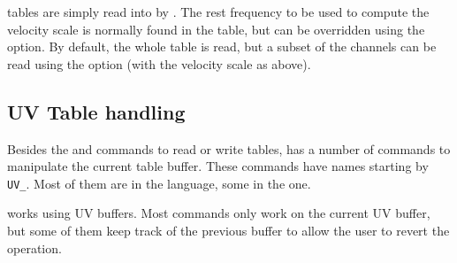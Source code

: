 \uv{} tables are simply read into \imager{} by .
The rest frequency to be used to compute the velocity scale
is normally found in the table, but can be overridden 
using the  option.
By default, the whole table is read, but a subset of the
channels can be read using the  option (with
the velocity scale as above).

\subsection{UV Table handling}

Besides the  and  commands to read
or write \uv{} tables, \imager{} has a number of commands to manipulate
the current \uv{} table buffer. These commands have names starting
by \texttt{UV\_}. Most of them are in the  language, some
in the  one. 

\imager{} works using UV buffers. Most commands only work on 
the current UV buffer, but some of them keep track of the previous
buffer to allow the user to revert the operation.

